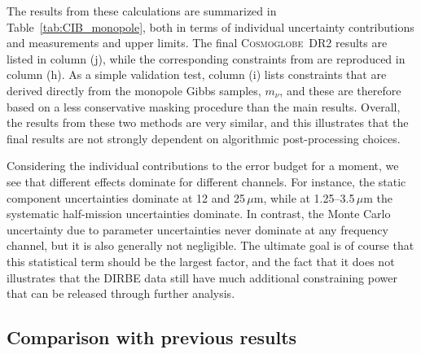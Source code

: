 \documentclass{aa}
\newcommand{\cosmoglobe}{\textsc{Cosmoglobe}}
\begin{document}

The results from these calculations are summarized in
Table~\ref{tab:CIB_monopole}, both in terms of individual uncertainty
contributions and measurements and upper limits. The final
\cosmoglobe\ DR2 results are listed in column (j), while the
corresponding constraints from \citet{hauser1998} are reproduced in
column (h). As a simple validation test, column (i) lists constraints
that are derived directly from the monopole Gibbs samples, $m_{\nu}$,
and these are therefore based on a less conservative masking procedure
than the main results. Overall, the results from these two methods are
very similar, and this illustrates that the final results are not
strongly dependent on algorithmic post-processing choices.

Considering the individual contributions to the error budget for a
moment, we see that different effects dominate for different
channels. For instance, the static component uncertainties dominate at
12 and 25$\,\mu\mathrm{m}$, while at 1.25--3.5$\,\mu\mathrm{m}$ the
systematic half-mission uncertainties dominate. In contrast, the Monte
Carlo uncertainty due to parameter uncertainties never dominate at any
frequency channel, but it is also generally not negligible. The
ultimate goal is of course that this statistical term should be the
largest factor, and the fact that it does not illustrates that the
DIRBE data still have much additional constraining power that can be
released through further analysis.

\subsection{Comparison with previous results}
\end{document}
